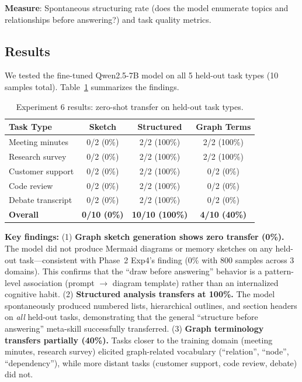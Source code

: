 \documentclass[11pt,a4paper]{article}
\begin{document}
\textbf{Measure}: Spontaneous structuring rate (does the model enumerate topics and relationships before answering?) and task quality metrics.

\subsection{Results}

We tested the fine-tuned Qwen2.5-7B model on all 5 held-out task types (10 samples total). Table~\ref{tab:exp6_res} summarizes the findings.

\begin{table}[h]
\centering\footnotesize
\caption{Experiment 6 results: zero-shot transfer on held-out task types.}
\label{tab:exp6_res}
\begin{tabular}{lccc}
\toprule
\textbf{Task Type} & \textbf{Sketch} & \textbf{Structured} & \textbf{Graph Terms} \\
\midrule
Meeting minutes   & 0/2 (0\%) & 2/2 (100\%) & 2/2 (100\%) \\
Research survey   & 0/2 (0\%) & 2/2 (100\%) & 2/2 (100\%) \\
Customer support  & 0/2 (0\%) & 2/2 (100\%) & 0/2 (0\%) \\
Code review       & 0/2 (0\%) & 2/2 (100\%) & 0/2 (0\%) \\
Debate transcript & 0/2 (0\%) & 2/2 (100\%) & 0/2 (0\%) \\
\midrule
\textbf{Overall}  & \textbf{0/10 (0\%)} & \textbf{10/10 (100\%)} & \textbf{4/10 (40\%)} \\
\bottomrule
\end{tabular}
\end{table}

\textbf{Key findings:} (1) \textbf{Graph sketch generation shows zero transfer (0\%).} The model did not produce Mermaid diagrams or memory sketches on any held-out task---consistent with Phase~2 Exp4's finding (0\% with 800 samples across 3 domains). This confirms that the ``draw before answering'' behavior is a pattern-level association (prompt $\rightarrow$ diagram template) rather than an internalized cognitive habit. (2) \textbf{Structured analysis transfers at 100\%.} The model spontaneously produced numbered lists, hierarchical outlines, and section headers on \textit{all} held-out tasks, demonstrating that the general ``structure before answering'' meta-skill successfully transferred. (3) \textbf{Graph terminology transfers partially (40\%).} Tasks closer to the training domain (meeting minutes, research survey) elicited graph-related vocabulary (``relation'', ``node'', ``dependency''), while more distant tasks (customer support, code review, debate) did not.
\end{document}
